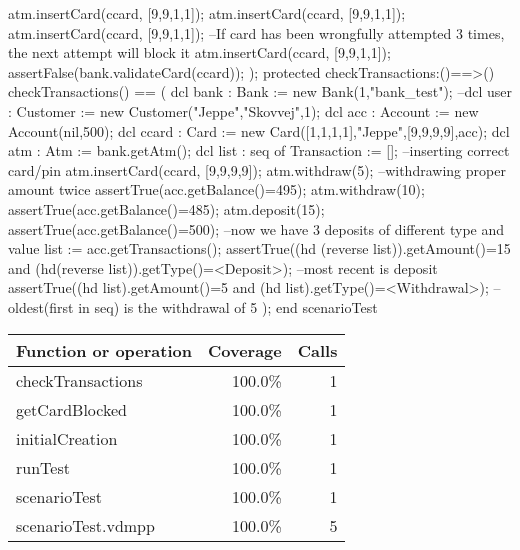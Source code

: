 \documentclass[a4paper]{article}
\begin{document}
\begin{vdm_al}
        atm.insertCard(ccard, [9,9,1,1]);
        atm.insertCard(ccard, [9,9,1,1]);
        atm.insertCard(ccard, [9,9,1,1]);
        --If card has been wrongfully attempted 3 times, the next attempt will block it
        atm.insertCard(ccard, [9,9,1,1]);
        assertFalse(bank.validateCard(ccard));
    );
    protected checkTransactions:()==>()
    checkTransactions() == (
        dcl bank : Bank := new Bank(1,"bank_test");
        --dcl user : Customer := new Customer("Jeppe","Skovvej",1);
        dcl acc : Account := new Account(nil,500);
        dcl ccard : Card := new Card([1,1,1,1],"Jeppe",[9,9,9,9],acc);
        dcl atm : Atm := bank.getAtm();
        dcl list : seq of Transaction := [];
        --inserting correct card/pin
        atm.insertCard(ccard, [9,9,9,9]);
        atm.withdraw(5); --withdrawing proper amount twice
        assertTrue(acc.getBalance()=495);
        atm.withdraw(10);
        assertTrue(acc.getBalance()=485);
        atm.deposit(15);
        assertTrue(acc.getBalance()=500); 
        --now we have 3 deposits of different type and value
        list := acc.getTransactions();
        assertTrue((hd (reverse list)).getAmount()=15 and (hd(reverse list)).getType()=<Deposit>); --most recent is deposit
        assertTrue((hd list).getAmount()=5 and (hd list).getType()=<Withdrawal>); --oldest(first in seq) is the withdrawal of 5
    );
end scenarioTest
\end{vdm_al}
\bigskip
\begin{longtable}{|l|r|r|}
\hline
Function or operation & Coverage & Calls \\
\hline
\hline
checkTransactions & 100.0\% & 1 \\
\hline
getCardBlocked & 100.0\% & 1 \\
\hline
initialCreation & 100.0\% & 1 \\
\hline
runTest & 100.0\% & 1 \\
\hline
scenarioTest & 100.0\% & 1 \\
\hline
\hline
scenarioTest.vdmpp & 100.0\% & 5 \\
\hline
\end{longtable}
\end{document}
